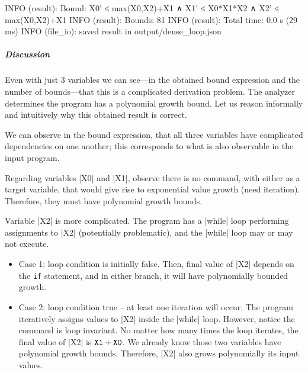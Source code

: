 \begin{center}
\begin{minipage}{\textwidth}
\begin{outlisting}[label={lst:ex5-output}]
INFO (result): Bound: X0' ≤ max(X0,X2)+X1 ∧ X1' ≤ X0*X1*X2 ∧ X2' ≤ max(X0,X2)+X1
INFO (result): Bounds: 81
INFO (result): Total time: 0.0 s (29 ms)
INFO (file_io): saved result in output/dense_loop.json
\end{outlisting}
\end{minipage}
\end{center}

\subparagraph*{Discussion}
Even with just 3 variables we can see---in the obtained bound expression and the number of bounds---that this is a complicated derivation problem.
The analyzer determines the program has a polynomial growth bound.
Let us reason informally and intuitively why this obtained result is correct.

We can observe in the bound expression, that all three variables have complicated dependencies on one another;
this corresponds to what is also observable in the input program.

Regarding variables \pr|X0| and \pr|X1|, observe there is no command, with either as a target variable, that would give rise to exponential value growth (need iteration).
Therefore, they must have polynomial growth bounds.

Variable \pr|X2| is more complicated.
The program has a \pr|while| loop performing assignments to \pr|X2| (potentially problematic), and the \pr|while| loop may or may not execute.

\begin{itemize}

\item Case 1: loop condition is initially false.
Then, final value of \pr|X2| depends on the \texttt{if} statement, and in either branch, it will have polynomially bounded growth.

\item Case 2: loop condition true -- at least one iteration will occur.
The program iteratively assigns values to \pr|X2| inside the \pr|while| loop.
However, notice the command is loop invariant.
No matter how many times the loop iterates, the final value of \pr|X2| is \(\prm{X1} + \prm{X0}\).
We already know those two variables have polynomial growth bounds.
Therefore, \pr|X2| also grows polynomially \wrt its input values.

\end{itemize}

